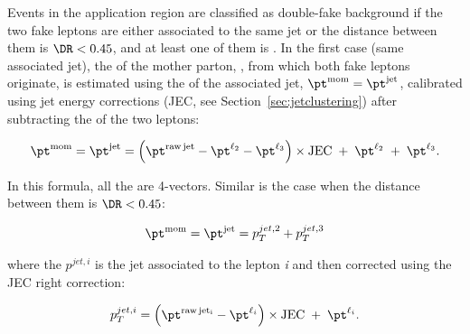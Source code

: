 Events in the application region are classified as double-fake
background if the two fake leptons are either associated to the same
jet or the distance between them is $\DR<0.45$, and at least one of them is \fo.
In the first case (same associated jet), the \pt of the mother parton, \ptm, from
which both fake leptons originate, is estimated using the \pt of the associated
jet, $\ptm=\ptj$, calibrated using jet energy corrections (JEC, see
Section~\ref{sec:jetclustering}) after subtracting the \pt of the two leptons:
\begin{linenomath}
  \begin{equation}
    \label{eq:ptjet}
    \ptm = \ptj =
    \left(\pt^{\mathrm{raw\,jet}}-\pt^{\ltwo}-\pt^{\lthree}\right)\times\mathrm{JEC}
    \;+\; \pt^{\ltwo} \;+\; \pt^{\lthree}.
  \end{equation}
\end{linenomath}
In this formula, all the \pt are 4-vectors.
Similar is the case when the distance between them is $\DR<0.45$:
\begin{linenomath}
  \begin{equation}
    \label{eq:ptjet_45}
    \ptm = \ptj = p^{jet,2}_T + p^{jet,3}_T 
  \end{equation}
\end{linenomath}
where the $p^{jet,i}$ is the jet associated to the lepton \emph{i} and then corrected using the JEC right correction:
\begin{linenomath}
  \begin{equation}
    \label{eq:ptjet_45_single}
    p_T^{jet,i} = \left(\pt^{\mathrm{raw\,jet_i}}-\pt^{\ell_{i}}\right)\times\mathrm{JEC}\;+\; \pt^{\ell_i} .
  \end{equation}
\end{linenomath}

